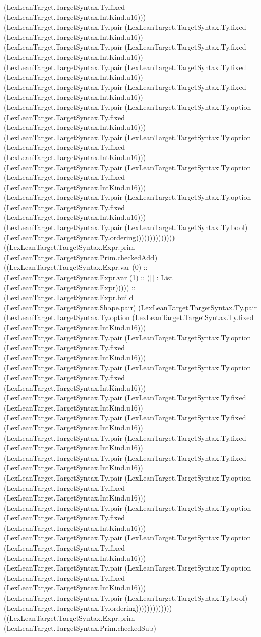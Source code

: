 \documentclass[11pt]{article}
\begin{document}
(LexLeanTarget.TargetSyntax.Ty.fixed (LexLeanTarget.TargetSyntax.IntKind.u16))) (LexLeanTarget.TargetSyntax.Ty.pair (LexLeanTarget.TargetSyntax.Ty.fixed (LexLeanTarget.TargetSyntax.IntKind.u16)) (LexLeanTarget.TargetSyntax.Ty.pair (LexLeanTarget.TargetSyntax.Ty.fixed (LexLeanTarget.TargetSyntax.IntKind.u16)) (LexLeanTarget.TargetSyntax.Ty.pair (LexLeanTarget.TargetSyntax.Ty.fixed (LexLeanTarget.TargetSyntax.IntKind.u16)) (LexLeanTarget.TargetSyntax.Ty.pair (LexLeanTarget.TargetSyntax.Ty.fixed (LexLeanTarget.TargetSyntax.IntKind.u16)) (LexLeanTarget.TargetSyntax.Ty.pair (LexLeanTarget.TargetSyntax.Ty.option (LexLeanTarget.TargetSyntax.Ty.fixed (LexLeanTarget.TargetSyntax.IntKind.u16))) (LexLeanTarget.TargetSyntax.Ty.pair (LexLeanTarget.TargetSyntax.Ty.option (LexLeanTarget.TargetSyntax.Ty.fixed (LexLeanTarget.TargetSyntax.IntKind.u16))) (LexLeanTarget.TargetSyntax.Ty.pair (LexLeanTarget.TargetSyntax.Ty.option (LexLeanTarget.TargetSyntax.Ty.fixed (LexLeanTarget.TargetSyntax.IntKind.u16))) (LexLeanTarget.TargetSyntax.Ty.pair (LexLeanTarget.TargetSyntax.Ty.option (LexLeanTarget.TargetSyntax.Ty.fixed (LexLeanTarget.TargetSyntax.IntKind.u16))) (LexLeanTarget.TargetSyntax.Ty.pair (LexLeanTarget.TargetSyntax.Ty.bool) (LexLeanTarget.TargetSyntax.Ty.ordering)))))))))))))) ((LexLeanTarget.TargetSyntax.Expr.prim (LexLeanTarget.TargetSyntax.Prim.checkedAdd) ((LexLeanTarget.TargetSyntax.Expr.var (0) :: (LexLeanTarget.TargetSyntax.Expr.var (1) :: ([] : List (LexLeanTarget.TargetSyntax.Expr))))) :: (LexLeanTarget.TargetSyntax.Expr.build (LexLeanTarget.TargetSyntax.Shape.pair) (LexLeanTarget.TargetSyntax.Ty.pair (LexLeanTarget.TargetSyntax.Ty.option (LexLeanTarget.TargetSyntax.Ty.fixed (LexLeanTarget.TargetSyntax.IntKind.u16))) (LexLeanTarget.TargetSyntax.Ty.pair (LexLeanTarget.TargetSyntax.Ty.option (LexLeanTarget.TargetSyntax.Ty.fixed (LexLeanTarget.TargetSyntax.IntKind.u16))) (LexLeanTarget.TargetSyntax.Ty.pair (LexLeanTarget.TargetSyntax.Ty.option (LexLeanTarget.TargetSyntax.Ty.fixed (LexLeanTarget.TargetSyntax.IntKind.u16))) (LexLeanTarget.TargetSyntax.Ty.pair (LexLeanTarget.TargetSyntax.Ty.fixed (LexLeanTarget.TargetSyntax.IntKind.u16)) (LexLeanTarget.TargetSyntax.Ty.pair (LexLeanTarget.TargetSyntax.Ty.fixed (LexLeanTarget.TargetSyntax.IntKind.u16)) (LexLeanTarget.TargetSyntax.Ty.pair (LexLeanTarget.TargetSyntax.Ty.fixed (LexLeanTarget.TargetSyntax.IntKind.u16)) (LexLeanTarget.TargetSyntax.Ty.pair (LexLeanTarget.TargetSyntax.Ty.fixed (LexLeanTarget.TargetSyntax.IntKind.u16)) (LexLeanTarget.TargetSyntax.Ty.pair (LexLeanTarget.TargetSyntax.Ty.option (LexLeanTarget.TargetSyntax.Ty.fixed (LexLeanTarget.TargetSyntax.IntKind.u16))) (LexLeanTarget.TargetSyntax.Ty.pair (LexLeanTarget.TargetSyntax.Ty.option (LexLeanTarget.TargetSyntax.Ty.fixed (LexLeanTarget.TargetSyntax.IntKind.u16))) (LexLeanTarget.TargetSyntax.Ty.pair (LexLeanTarget.TargetSyntax.Ty.option (LexLeanTarget.TargetSyntax.Ty.fixed (LexLeanTarget.TargetSyntax.IntKind.u16))) (LexLeanTarget.TargetSyntax.Ty.pair (LexLeanTarget.TargetSyntax.Ty.option (LexLeanTarget.TargetSyntax.Ty.fixed (LexLeanTarget.TargetSyntax.IntKind.u16))) (LexLeanTarget.TargetSyntax.Ty.pair (LexLeanTarget.TargetSyntax.Ty.bool) (LexLeanTarget.TargetSyntax.Ty.ordering))))))))))))) ((LexLeanTarget.TargetSyntax.Expr.prim (LexLeanTarget.TargetSyntax.Prim.checkedSub) 
\end{document}
